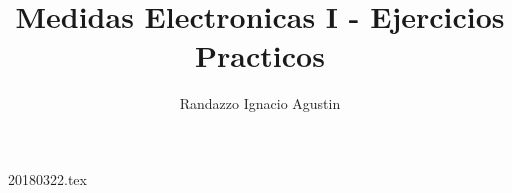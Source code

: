 

\title{Medidas Electronicas I - Ejercicios Practicos}
\author{Randazzo Ignacio Agustin}


\maketitle
\tableofcontents

{20180322.tex}



